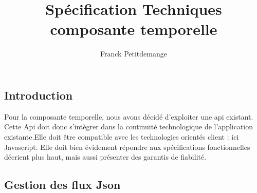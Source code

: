 \documentclass[10pt,a4paper]{article}
\author{Franck Petitdemange}
\title{Spécification Techniques composante temporelle}
\begin{document}
\subsection{Introduction}
Pour la composante temporelle, nous avons décidé d'exploiter une api existant. Cette Api doit donc s'intègrer dans la continuité technologique de l'application existante.Elle doit être compatible avec les technologies orientés client : ici Javascript. Elle doit bien évidement répondre aux spécifications fonctionnelles décrient plus haut, mais aussi présenter des garantis de fiabilité.

\subsection{Gestion des flux Json}
\end{document}
